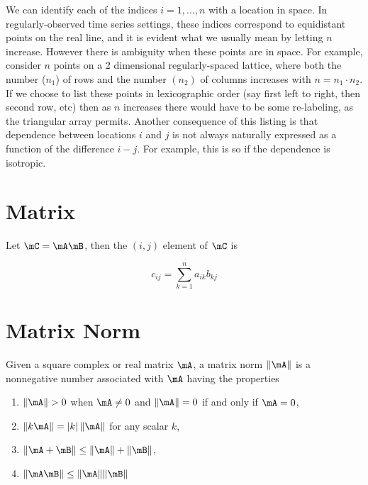 \documentclass[english,12pt]{book}\usepackage[]{graphicx}\usepackage[]{xcolor}
\begin{document}
We can identify each of the indices $i = 1,...,n$ with a location in space. In regularly-observed time series settings, these indices correspond to equidistant points on the real line, and it is evident what we usually mean by letting $n$ increase. However there is ambiguity when these points are in space. For example, consider $n$ points on a 2 dimensional regularly-spaced lattice, where both the number ($n_1$) of rows and the number $(n_2)$ of columns increases with $n=n_1\cdot n_2$. If we choose to list these points in lexicographic order (say first left to right, then second row, etc) then as $n$ increases there would have to be some re-labeling, as the triangular array permits. Another consequence of this listing is that dependence between locations $i$ and $j$ is not always naturally expressed as a function of the difference $i-j$. For example, this is so if the dependence is isotropic. 

\section{Matrix}

Let $\mC = \mA\mB$, then the $(i,j)$ element of $\mC$ is

\begin{equation}
c_{ij} = \sum_{k = 1}^na_{ik}b_{kj}
\end{equation}




\section{Matrix Norm}

\begin{definition}
Given a square complex or real matrix $\mA$, a matrix norm $\lVert \mA \rVert$ is a nonnegative number associated with $\mA$ having the properties

\begin{enumerate}
  \item $\lVert \mA \rVert> 0$ when $\mA\neq 0$ and $\lVert \mA \rVert = 0$ if and only if $\mA = 0$, 
  \item $\lVert k \mA \rVert = \left|k\right|\lVert \mA \rVert$ for any scalar $k$, 
  \item $\lVert \mA  + \mB \rVert \leq \lVert \mA \rVert + \lVert \mB \rVert$, 
  \item $\lVert \mA\mB \rVert \leq \lVert \mA \rVert \lVert \mB \rVert$
\end{enumerate}
\end{definition}
\end{document}

